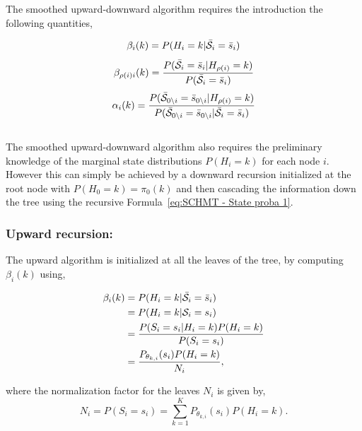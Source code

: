 \documentclass[a4paper,11pt]{report}
\begin{document}
			The smoothed upward-downward algorithm requires the introduction the following quantities,
			
			\begin{equation}
			  \beta_{i}(k) = P(H_{i}=k | \bar{\mathcal{S}}_{i}= \bar{s}_{i})
			  \label{eq:UD beta node}
			\end{equation}
			\begin{equation}
			  \beta_{\rho(i)i}(k) = \frac{P(\bar{\mathcal{S}}_{i}= \bar{s}_{i} | H_{\rho(i)}=k)} {P(\bar{\mathcal{S}}_{i}= \bar{s}_{i}) }
			  \label{eq:UD beta node and parents}
			\end{equation}
						\begin{equation}
			  \alpha_{i}(k) = \frac{P(\bar{\mathcal{S}}_{0\backslash i}= \bar{s}_{0\backslash i} | H_{\rho(i)}=k)} {P(\bar{\mathcal{S}}_{0\backslash i}= \bar{s}_{0\backslash i} | \bar{\mathcal{S}}_{i}= \bar{s}_{i} ) }
			  \label{eq:UD alpha}
			\end{equation}\\
			
			The smoothed upward-downward algorithm also requires the preliminary knowledge  of the marginal state distributions $P(H_{i}=k)$ for each node $i$. However this can simply be achieved by a downward recursion initialized at the root node with $P(H_{0}=k)=\pi_{0}(k)$ and then cascading the information down the tree using the recursive Formula~\ref{eq:SCHMT - State proba 1}.
			
			\subsubsection{Upward recursion:}
				\label{subsubsec:SCHMT/Learning/E/Up}
				The upward algorithm is initialized at all the leaves of the tree, by computing $\beta_{i}(k)$ using,
				
				\begin{equation}
					\begin{split}
						\beta_{i}(k)	&= P(H_{i}=k | \bar{\mathcal{S}}_{i}= \bar{s}_{i})\\
													&= P(H_{i}=k | \mathcal{S}_{i}= s_{i})\\
													&= \frac{P(S_{i}= s_{i} | H_{i}=k)P(H_{i}=k)} {P(S_{i}= s_{i})}\\
													&= \frac{P_{\theta_{k,i}}(s_{i}) P(H_{i}=k)} {N_{i}},
						\end{split}
						\label{eq:upward beta leaf}
				\end{equation}
				
				where the normalization factor for the leaves $N_{i}$ is given by,
				\begin{equation}
					N_{i}	= P(S_{i}= s_{i}) = \sum_{k=1}^{K} P_{\theta_{k,i}}(s_{i}) P(H_{i}=k).
					\label{eq:upward normalization leaf}
				\end{equation}
				
\end{document}
